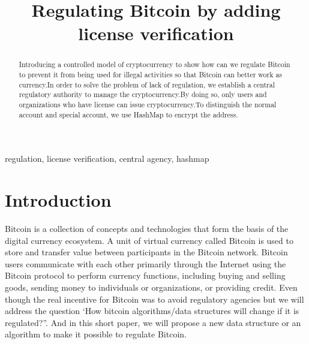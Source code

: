 \documentclass[conference]{IEEEtran}
\begin{document}
\title{Regulating Bitcoin by adding license verification\\
}

\author{
\and
{}
\and
{}
}

\maketitle

\begin{abstract}
Introducing a controlled model of cryptocurrency to show how can we regulate Bitcoin to prevent it from being used for illegal activities so that Bitcoin can better work as currency.In order to solve the problem of lack of regulation, we establish a central regulatory authority to manage the cryptocurrency.By doing so, only users and organizations who have license can issue cryptocurrency.To distinguish the normal account and special account, we use HashMap to encrypt the address.
\end{abstract}

\begin{IEEEkeywords}
regulation, license verification, central agency, hashmap
\end{IEEEkeywords}

\section{Introduction}
Bitcoin is a collection of concepts and technologies that form the basis of the digital currency ecosystem. A unit of virtual currency called Bitcoin is used to store and transfer value between participants in the Bitcoin network. Bitcoin users communicate with each other primarily through the Internet using the Bitcoin protocol to perform currency functions, including buying and selling goods, sending money to individuals or organizations, or providing credit. Even though the real incentive for Bitcoin was to avoid regulatory agencies but we will address the question ‘How bitcoin algorithms/data structures will change if it is regulated?”. And in this short paper, we will propose a new data structure or an algorithm to make it possible to regulate Bitcoin\cite{antonopoulos2017mastering}.
\end{document}
